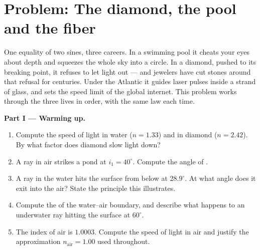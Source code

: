 \section{Problem: The diamond, the pool and the fiber}

\begin{problem}
\label{pb:g10:refraction:1}
One equality of two sines, three careers. In a swimming pool it cheats
your eyes about depth and squeezes the whole sky into a circle. In a
diamond, pushed to its breaking point, it refuses to let light out ---
and jewelers have cut stones around that refusal for centuries. Under
the Atlantic it guides laser pulses inside a strand of glass, and sets
the speed limit of the global internet. This problem works through the
three lives in order, with the same law each time.

\medskip
\noindent\textbf{Part I --- Warming up.}
\begin{enumerate}
  \item Compute the speed of light in water ($n = 1.33$) and in diamond
        ($n = 2.42$). By what factor does diamond slow light down?
  \item A ray in air strikes a pond at $i_1 = 40^\circ$. Compute the
        angle of .
  \item A ray in the water hits the surface from below at $28.9^\circ$.
        At what angle does it exit into the air? State the principle
        this illustrates.
  \item Compute the  of the water--air boundary, and
        describe what happens to an underwater ray hitting the surface
        at $60^\circ$.
  \item The index of air is $1.0003$. Compute the speed of light in air
        and justify the approximation $n_{\text{air}} = 1.00$ used
        throughout.
\end{enumerate}


\end{problem}
